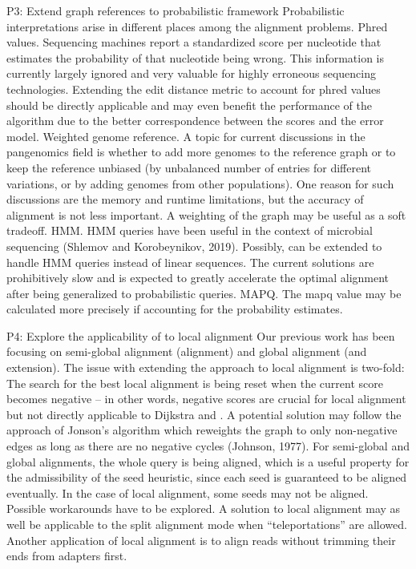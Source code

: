 P3: Extend graph references to probabilistic framework Probabilistic
interpretations arise in different places among the alignment problems. Phred
values. Sequencing machines report a standardized score per nucleotide that
estimates the probability of that nucleotide being wrong. This information is
currently largely ignored and very valuable for highly erroneous sequencing
technologies. Extending the edit distance metric to account for phred values
should be directly applicable and may even benefit the performance of the \A
algorithm due to the better correspondence between the scores and the error
model. Weighted genome reference. A topic for current discussions in the
pangenomics field is whether to add more genomes to the reference graph or to
keep the reference unbiased (by unbalanced number of entries for different
variations, or by adding genomes from other populations). One reason for such
discussions are the memory and runtime limitations, but the accuracy of
alignment is not less important. A weighting of the graph may be useful as a
soft tradeoff. HMM. HMM queries have been useful in the context of microbial
sequencing (Shlemov and Korobeynikov, 2019). Possibly, \A can be extended to
handle HMM queries instead of linear sequences. The current solutions are
prohibitively slow and \astarix is expected to greatly accelerate the optimal
alignment after being generalized to probabilistic queries. MAPQ. The mapq value
may be calculated more precisely if accounting for the probability estimates.

P4: Explore the applicability of \A to local alignment Our previous work has
been focusing on semi-global alignment (alignment) and global alignment (and
extension). The issue with extending the \A approach to local alignment is
two-fold: The search for the best local alignment is being reset when the
current score becomes negative – in other words, negative scores are crucial for
local alignment but not directly applicable to Dijkstra and \A. A potential
solution may follow the approach of Jonson’s algorithm which reweights the graph
to only non-negative edges as long as there are no negative cycles (Johnson,
1977). For semi-global and global alignments, the whole query is being aligned,
which is a useful property for the admissibility of the seed heuristic, since
each seed is guaranteed to be aligned eventually. In the case of local
alignment, some seeds may not be aligned. Possible workarounds have to be
explored. A solution to local alignment may as well be applicable to the split
alignment mode when “teleportations” are allowed. Another application of local
alignment is to align reads without trimming their ends from adapters first.

